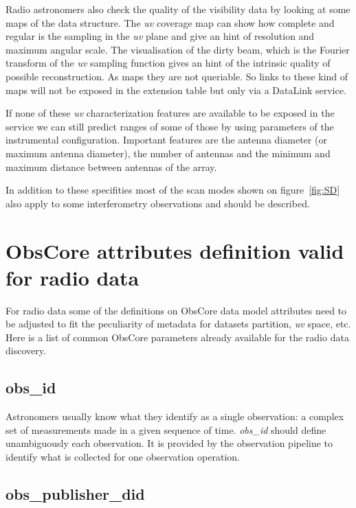 \documentclass[11pt,a4paper]{ivoa}
\begin{document}
Radio astronomers also check the quality of the visibility data by looking at some maps of
the data structure. The \emph{uv} coverage map can show how complete and regular is the sampling in
the \emph{uv} plane and give an hint of resolution and maximum angular scale.
The visualisation of the dirty beam, which is the Fourier transform of the \emph{uv} sampling
function gives an hint of the intrinsic quality of possible reconstruction. As maps they are
not queriable. So links to these kind of maps will not be exposed in the extension
table but only via a DataLink service.

If none of these \emph{uv} characterization features are available to be exposed in the service
we can still predict ranges of some of those by using parameters of the instrumental configuration. 
Important features are the antenna diameter (or maximum antenna diameter), the number of
antennas and the minimum and maximum distance between antennas of the array.

In addition to these specifities most of the scan modes shown on figure~\ref{fig:SD} also
apply to some interferometry observations and should be described.

\section{ObsCore attributes definition valid for radio data}
\label{sec:ObsCoreRadDef}

For radio data some of the definitions on ObsCore data model attributes need to be adjusted
to fit the peculiarity of metadata for datasets partition, \emph{uv} space, etc.
Here is a list of common ObsCore parameters already available for the radio data discovery.

\subsection{obs\_id}

Astronomers usually know what they identify as a single observation: a complex set of
measurements made in a given sequence of time. \emph{obs\_id} should define unambiguously each
observation. It is provided by the observation pipeline to identify what is collected for one observation operation.

\subsection{obs\_publisher\_did}
\end{document}
